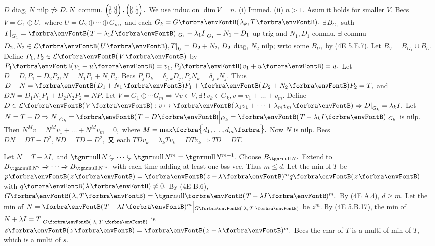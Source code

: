 \ANote $D$ diag, $N$ nilp $\notRightarrow D,N$ commu. \AExa $\footnotesize\begin{pmatrix}1&\hspace{-6pt}0\\[-4pt]0&\hspace{-6pt}0\end{pmatrix},\begin{pmatrix}0&\hspace{-6pt}1\\[-4pt]0&\hspace{-6pt}0\end{pmatrix}.$\vspace{2pt}\parSol{}
We use induc on $\dim V=n.$ (i) Immed. (ii) $n>1.$ Asum it holds for smaller $V.$\parSol{}
Becs $V=G_1\oplus U,$ where $U=G_2\oplus\cdots\oplus G_m,$ and each $G_k=G\Par{\lambda_k,T}.$\parSol{}
$\exists\,B_{G_1}$ suth $T\mmid_{G_1}=\Par{T-\lambda_1I}\Big|{_{G_1}}+\lambda_1I\mmid_{G_1}=N_1+D_1$ up-trig and $N_1,D_1$ commu.\parSol{}
$\exists$ commu $D_2,N_2\in\Lm{U},T\mmid_U=D_2+N_2,\,D_2$ diag, $N_2$ nilp; wrto some $B_U,$ by (4E 5.E.7).\parSol{}
Let $B_V=B_{G_1}\cup B_U.$ Define $P_1,P_2\in\Lm{V}$ by $P_1\Par{v_1+u}=v_1,P_2\Par{v_1+u}=u.$\parSol{}
Let $D=D_1P_1+D_2P_2,N=N_1P_1+N_2P_2.$ \:Becs $P_jD_k=\delta_{j,k}D_j,P_jN_k=\delta_{j,k}N_j.$\parSol{}
Thus $D+N=\Par{D_1+N_1}P_1+\Par{D_2+N_2}P_2=T,$ and $DN=D_1N_1P_1+D_2N_2P_2=NP.$\PfEnd\vspace{3pt}\parSol{}
\Or Let $V=G_1\oplus\cdots G_m\Rightarrow\forall v\in V,\exists\,!\,v_k\in G_k,v=v_1+\dots+v_m.$\parSol{}
Define $D\in\Lm{V}:v\mapsto\Par{\lambda_1v_1+\dots+\lambda_mv_m}\Rightarrow D\mmid_{G_k}=\lambda_kI.$\parSol{}
Let $N=T-D\Rightarrow N\mmid_{G_k}=\Par{T-D}\Big|{_{G_k}}=\Par{T-\lambda_kI}\Big|{_{G_k}}$ is nilp.\parSol{}
Then $N^Mv=N^Mv_1+\dots+N^Mv_m=0,$ where $M=\max\!\Bra{d_1,\dots,d_m}.$ Now $N$ is nilp.\parSol{}
Becs $DN=DT-D^2,ND=TD-D^2,$ 又 each $TDv_k=\lambda_kTv_k=DTv_k\Rightarrow TD=DT.$\PfEnd
\SepLine

Let $N=T-\lambda I,$ and $\null N\subsetneq\cdots\subsetneq\null N^m=\null N^{m+1}.$ Choose $B_{\null N}.$\parSol{}
Extend to $B_{\null N^2}\Rightarrow\cdots\Rightarrow B_{\null N^m},$ with each time adding at least one bss vec. Thus $m\leqslant d.$\PfEnd\vspace{3pt}\parSol{}
\Or Let the min of $T$ be $p\Par{z}=\Par{z-\lambda}{^m}q\Par{z}$ with $q\Par{\lambda}\neq0.$\parSol{}
\;By (4E B.6), $G\Par{\lambda,T}=\Null\Par{T-\lambda I}{^m}.$ By (4E A.4), $d\geqslant m.$\PfEnd\vspace{3pt}\parSol{}
\Or Let the min of $N=\Par{T-\lambda I}{^m}\Big|{_{G\SmallPar{\,\lambda,\,T\,}}}$ be $z^m.$\parSol{}
By (4E 5.B.17), the min of $N+\lambda I=T\mmid_{G\SmallPar{\,\lambda,\,T\,}}$ is $s\Par{z}=\Par{z-\lambda}{^m}.$\parSol{}
Becs the char of $T$  is a multi of min of $T,$ which is a multi of $s.$\PfEnd
\SepLine

